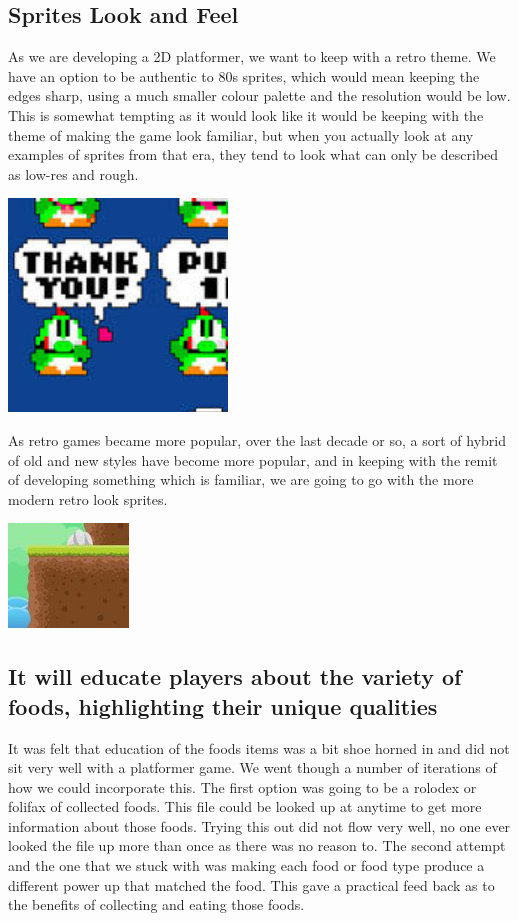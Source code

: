 \documentclass{article}
\begin{document}
\subsection{ Sprites Look and Feel }
As we are developing a 2D platformer, we want to keep with a retro theme. We have an option to be authentic to 80s sprites, which would mean keeping the edges sharp, using a much smaller colour palette and the resolution would be low.
This is somewhat tempting as it would look like it would be keeping with the theme of making the game look familiar, but when you actually look at any examples of sprites from that era, they tend to look what can only be described as low-res and rough.

\includegraphics[scale=0.5]{TraditionalSprite}

As retro games became more popular, over the last decade or so, a sort of hybrid of old and new styles have become more popular, and in keeping with the remit of developing something which is familiar, we are going to go with the more modern retro look sprites.

\includegraphics[scale=0.5]{SoftSprite}


\subsection{ It will educate players about the variety of foods, highlighting their unique qualities }
It was felt that education of the foods items was a bit shoe horned in and did not sit very well with a platformer game.
We went though a number of iterations of how we could incorporate this. The first option was going to be a rolodex or folifax of collected foods. This file could be looked up at anytime to get more information about those foods.
Trying this out did not flow very well, no one ever looked the file up more than once as there was no reason to.
The second attempt and the one that we stuck with was making each food or food type produce a different power up that matched the food. This gave a practical feed back as to the benefits of collecting and eating those foods.
\end{document}
